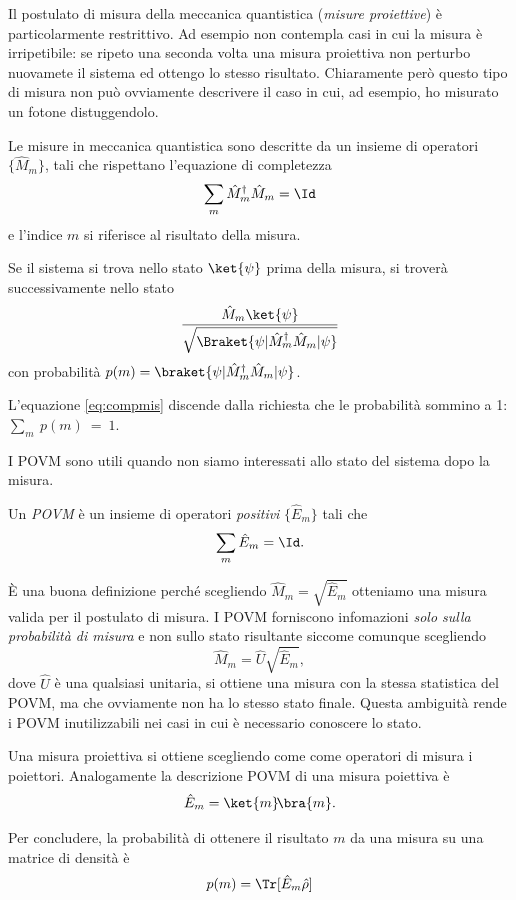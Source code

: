 \documentclass[a4]{article}
\begin{document}
Il postulato di misura della meccanica quantistica (\emph{misure proiettive}) è particolarmente
restrittivo. Ad esempio non contempla casi in cui la misura è irripetibile: se ripeto una
seconda volta una misura proiettiva non perturbo nuovamete il sistema ed ottengo lo stesso
risultato. Chiaramente però questo tipo di misura non può ovviamente descrivere il caso in
cui, ad esempio, ho misurato un fotone distuggendolo.
\begin{post}[di misura]
Le misure in meccanica quantistica sono descritte da un insieme di operatori
\(\{\hat{M}_m\}\), tali che rispettano l'equazione di completezza
\begin{equation} \label{eq:compmis}
\sum_m \hat{M}^\dag_m \hat{M}_m = \Id
\end{equation}
e l'indice \(m\) si riferisce al risultato della misura.

Se il sistema si trova nello stato \(\ket{\psi}\) prima della misura, si troverà successivamente
nello stato
\[ \frac{\hat{M}_m \ket{\psi}}{\sqrt{\Braket{\psi|\hat{M}^\dag_m \hat{M}_m|\psi}}}\]
con probabilità \(p(m)= \braket{\psi|\hat{M}^\dag_m \hat{M}_m|\psi}\).
\end{post}
L'equazione \eqref{eq:compmis} discende dalla richiesta che le probabilità sommino a 1:
\(\sum_m~p(m)~=~1\).

I POVM sono utili quando non siamo interessati allo stato del sistema dopo la misura.
\begin{defn}[POVM]
Un \emph{POVM} è un insieme di operatori \emph{positivi} \(\{\hat{E}_m\}\) tali che
\[\sum_m \hat{E}_m  = \Id.\]
\end{defn}
È una buona definizione perché scegliendo \(\hat{M}_m = \sqrt{\hat{E}_m}\) otteniamo una
misura valida per il postulato di misura. I POVM forniscono infomazioni \emph{solo sulla
probabilità di misura} e non sullo stato risultante siccome comunque scegliendo
\[\hat{M}_m = \hat{U}\sqrt{\hat{E}_m},\]
dove \(\hat{U}\) è una qualsiasi unitaria, si ottiene una misura con la stessa statistica
del POVM, ma che ovviamente non ha lo stesso stato finale. Questa ambiguità
rende i POVM inutilizzabili nei casi in cui è necessario conoscere lo stato.

Una misura proiettiva si ottiene scegliendo come come operatori di misura
i poiettori. Analogamente la descrizione POVM di una misura poiettiva è
\[\hat{E}_m = \ket{m}\!\bra{m}.\]

Per concludere, la probabilità di ottenere il risultato \(m\) da una misura su
una matrice di densità è
\[p(m) = \Tr[\hat{E}_m \hat{\rho}]\]
\end{document}
